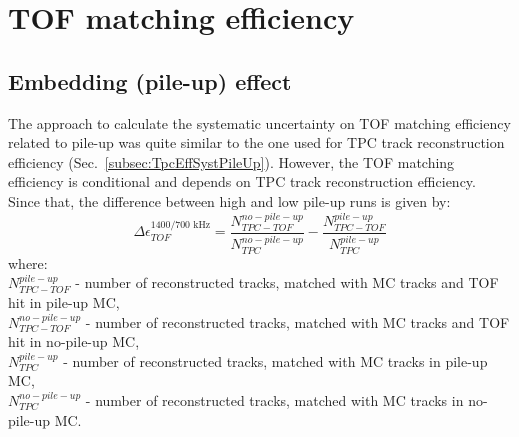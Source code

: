\section{TOF matching efficiency}\label{sec:tofSystematics}
\subsection{Embedding (pile-up) effect}\label{sec:tofSystematicsPileUpEffect}
The approach to calculate the systematic uncertainty on TOF matching efficiency related to pile-up was quite similar to the one used for TPC track reconstruction efficiency (Sec.~\ref{subsec:TpcEffSystPileUp}). However, the TOF matching efficiency is conditional and depends on TPC track reconstruction efficiency. Since that, the difference between high and low pile-up runs is given by:
\begin{equation}
\Delta\epsilon_{ TOF}^{1400/700\text{ kHz}}=\frac{N_{TPC-TOF}^{no-pile-up}}{N_{TPC}^{no-pile-up}}-\frac{N_{TPC-TOF}^{pile-up}}{N_{TPC}^{pile-up}}
\label{eq:tofSyst}
\end{equation}
where:\\
$N_{TPC-TOF}^{pile-up}$ - number of reconstructed tracks, matched with MC tracks and TOF hit in pile-up MC,\\
$N_{TPC-TOF}^{no-pile-up}$ - number of reconstructed tracks, matched with MC tracks and TOF hit in no-pile-up MC,\\
$N_{TPC}^{pile-up}$ - number of reconstructed tracks, matched with MC tracks in pile-up MC,\\
$N_{TPC}^{no-pile-up}$ - number of reconstructed tracks, matched with MC tracks in no-pile-up MC.

